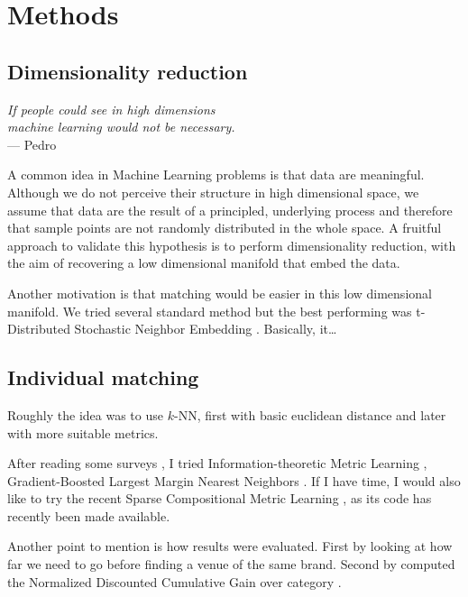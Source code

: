 \chapter{Methods}
\label{chap:methods}

\section{Dimensionality reduction}

\begin{flushright}{\slshape
 If people could see in high dimensions \\
 machine learning would not be necessary.
} \\ \medskip
--- Pedro \Textcite{MLKnowledge12}
\end{flushright}

A common idea in Machine Learning problems is that data are meaningful.
Although we do not perceive their structure in high dimensional space, we
assume that data are the result of a principled, underlying process and
therefore that sample points are not randomly distributed in the whole space.
A fruitful approach to validate this hypothesis is to perform dimensionality
reduction, with the aim of recovering a low dimensional manifold that embed
the data.

Another motivation is that matching would be easier in this low dimensional
manifold. We tried several standard method but the best performing was
t-Distributed Stochastic Neighbor Embedding \autocite{tSNE08}. Basically, it…

\section{Individual matching}

Roughly the idea was to use $k$-NN, first with basic euclidean distance and
later with more suitable metrics.

After reading some surveys \autocite{MetricSurvey06, MetricSurvey13}, I tried
Information-theoretic Metric Learning \autocite{InfoMetric07},
Gradient-Boosted Largest Margin Nearest Neighbors \autocite{GBLMNN12}. If I
have time, I would also like to try the recent Sparse Compositional Metric
Learning \autocite{SparseMetric14}, as its code has recently been made available.

Another point to mention is how results were evaluated. First by looking at
how far we need to go before finding a venue of the same brand. Second by
computed the Normalized Discounted Cumulative Gain over category
\autocite{IREvaluation07}.


